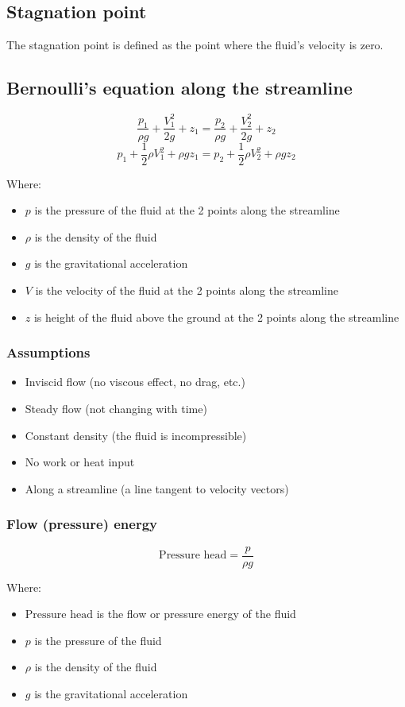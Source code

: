\documentclass[11pt]{article}
\begin{document}
\subsection{Stagnation point}
\label{sec:org1eb5f32}
The stagnation point is defined as the point where the fluid's velocity is zero.

\subsection{Bernoulli's equation along the streamline}
\label{sec:org61ba580}
\[\frac{p_1}{\rho g} + \frac{V_1^2}{2g} + z_1 = \frac{p_2}{\rho g} + \frac{V_2^2}{2g} + z_2\]
\[p_1 + \frac{1}{2} \rho V_1^2 + \rho gz_1 = p_2 + \frac{1}{2} \rho V_2^2 + \rho gz_2\]

Where:
\begin{itemize}
\item \(p\) is the pressure of the fluid at the 2 points along the streamline
\item \(\rho\) is the density of the fluid
\item \(g\) is the gravitational acceleration
\item \(V\) is the velocity of the fluid at the 2 points along the streamline
\item \(z\) is height of the fluid above the ground at the 2 points along the streamline
\end{itemize}

\subsubsection{Assumptions}
\label{sec:orgca048e9}
\begin{itemize}
\item Inviscid flow (no viscous effect, no drag, etc.)
\item Steady flow (not changing with time)
\item Constant density (the fluid is incompressible)
\item No work or heat input
\item Along a streamline (a line tangent to velocity vectors)
\end{itemize}

\subsubsection{Flow (pressure) energy}
\label{sec:orgdbc2604}
\[\text{Pressure head} = \frac{p}{\rho g}\]

Where:
\begin{itemize}
\item \(\text{Pressure head}\) is the flow or pressure energy of the fluid
\item \(p\) is the pressure of the fluid
\item \(\rho\) is the density of the fluid
\item \(g\) is the gravitational acceleration
\end{itemize}
\end{document}
